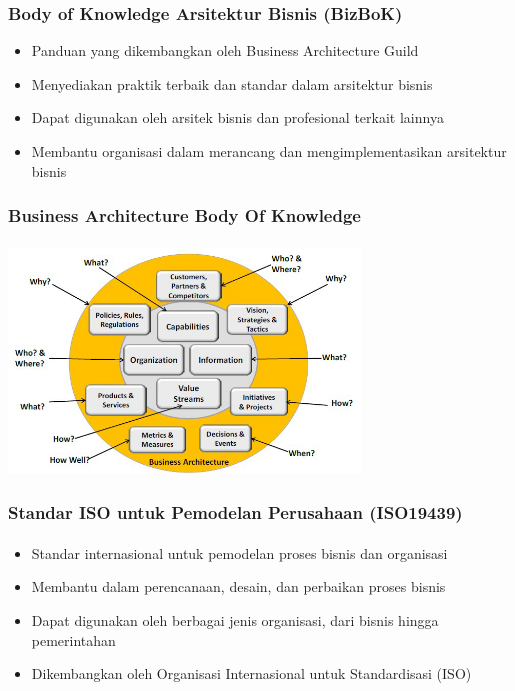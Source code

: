 \documentclass[aspectratio=169, table]{beamer}
\begin{document}
	\begin{frame}
		\frametitle{Body of Knowledge Arsitektur Bisnis (BizBoK)}
		\begin{itemize}
			\item Panduan yang dikembangkan oleh Business Architecture Guild
			\item Menyediakan praktik terbaik dan standar dalam arsitektur bisnis
			\item Dapat digunakan oleh arsitek bisnis dan profesional terkait lainnya
			\item Membantu organisasi dalam merancang dan mengimplementasikan arsitektur bisnis
		\end{itemize}
	\end{frame}

	{
		\begin{frame}
			\frametitle{Business Architecture Body Of Knowledge}
            \framesubtitle{\hspace{1cm}}
			\begin{center}
				\includegraphics[width=0.7\textwidth]{../figures/bizbok}
			\end{center}
		\end{frame}
	}

	\begin{frame}
		\frametitle{Standar ISO untuk Pemodelan Perusahaan (ISO19439)}
        \framesubtitle{\hspace{1cm}}
		\begin{itemize}
			\item Standar internasional untuk pemodelan proses bisnis dan organisasi
			\item Membantu dalam perencanaan, desain, dan perbaikan proses bisnis
			\item Dapat digunakan oleh berbagai jenis organisasi, dari bisnis hingga pemerintahan
			\item Dikembangkan oleh Organisasi Internasional untuk Standardisasi (ISO)
		\end{itemize}
	\end{frame}
\end{document}
